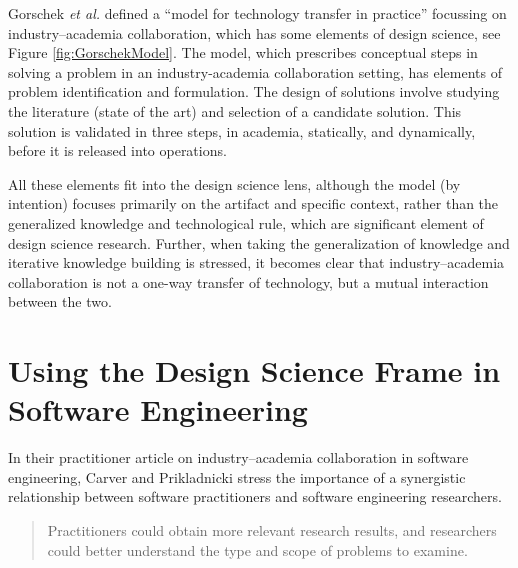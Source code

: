 \documentclass[graybox]{svmult}
\begin{document}
Gorschek \emph{et al.} defined a ``model for technology transfer in practice'' \cite{GorschekSW2006} focussing on industry--academia collaboration, which has some elements of design science, see Figure \ref{fig:GorschekModel}. The model, which prescribes conceptual steps in solving a problem in an industry-academia collaboration setting, has elements of problem identification and formulation. The design of solutions involve studying the literature (state of the art) and selection of a candidate solution. This solution is validated in three steps, in academia, statically, and dynamically, before it is released into operations. 

All these elements fit into the design science lens, although the model (by intention) focuses primarily on the artifact and specific context, rather than the generalized knowledge and technological rule, which are significant element of design science research. Further, when taking the generalization of knowledge and iterative knowledge building is stressed, it becomes clear that industry--academia collaboration is not a one-way transfer of technology, but a mutual interaction between the two.


\section{Using the Design Science Frame in Software Engineering}

In their practitioner article on industry--academia collaboration in software engineering, Carver and Prikladnicki stress the importance of a synergistic relationship between software practitioners and software engineering researchers.
\begin{quote}Practitioners could obtain more relevant research results, and researchers could better understand the type and scope of problems to examine.~\cite{CarverIEEESW2018}
\end{quote} 
\end{document}
